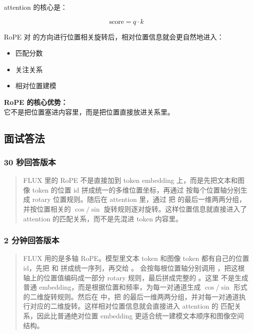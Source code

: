 attention 的核心是：

\[
\text{score} = q \cdot k
\]

RoPE 对  的方向进行位置相关旋转后，相对位置信息就会更自然地进入：

\begin{itemize}[leftmargin=1.5em]
  \item 匹配分数
  \item 关注关系
  \item 相对位置建模
\end{itemize}

\begin{summarybox}
\textbf{RoPE 的核心优势：}\\
它不是把位置塞进内容里，而是把位置直接放进关系里。
\end{summarybox}

\subsection{面试答法}

\subsubsection{30 秒回答版本}

\begin{quote}
FLUX 里的 RoPE 不是直接加到 token embedding 上，而是先把文本和图像 token 的位置 id 拼成统一的多维位置坐标，再通过  按每个位置轴分别生成 rotary 位置规则。随后在 attention 里，通过  把  的最后一维两两分组，并按位置相关的 $\cos/\sin$ 旋转规则逐对旋转。这样位置信息就直接进入了 attention 的匹配关系，而不是先混进 token 内容里。
\end{quote}

\subsubsection{2 分钟回答版本}

\begin{quote}
FLUX 用的是多轴 RoPE。模型里文本 token 和图像 token 都有自己的位置 id，先把  和  拼成统一序列，再交给 。 会按每根位置轴分别调用 ，把这根轴上的位置值编码成一部分 rotary 规则，最后拼成完整的 。这里  不是生成普通 embedding，而是根据位置和频率，为每一对通道生成 $\cos/\sin$ 形式的二维旋转规则。然后在  中，把  的最后一维两两分组，并对每一对通道执行对应的二维旋转。这样相对位置信息就会直接进入 attention 的  匹配关系，因此比普通绝对位置 embedding 更适合统一建模文本顺序和图像空间结构。
\end{quote}

